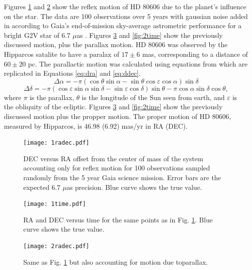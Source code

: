 \documentclass[preprint]{aastex}
\begin{document}
Figures \ref{fig:1radec} and \ref{fig:1time} show the reflex motion of HD 80606 due to the planet's influence on the star. The data are 100 observations over 5 years with gaussian noise added in according to Gaia's end-of-mission sky-average astrometric performance for a bright G2V star of 6.7 $\mu$as \citep{gaia}. 
Figures \ref{fig:2radec} and \ref{fig:2time} show the previously discussed motion, plus the parallax motion. HD 80606 was observed by the Hipparcos satalite to have a paralax of $17\pm6$ mas, corresponding to a distance of $60\pm20$ pc. The parallactic motion was calculated using equations from \citet{parallax} which are replicated in Equations \ref{eq:dra} and \ref{eq:ddec}. 
\begin{equation}
    \Delta\alpha=-\pi(\cos\theta\sin\alpha-\sin\theta\cos\varepsilon\cos\alpha)\sin\delta
    \label{eq:dra}
\end{equation}
\begin{equation}
    \Delta\delta=-\pi(\cos\varepsilon\sin\alpha\sin\delta-\sin\varepsilon\cos\delta)\sin\theta-\pi\cos\alpha\sin\delta\cos\theta,
    \label{eq:ddec}
\end{equation}
where $\pi$ is the parallax, $\theta$ is the longitude of the Sun seen from earth, and $\varepsilon$ is the obliquity of the ecliptic.
Figures \ref{fig:2radec} and \ref{fig:2time} show the previously discussed motion plus the propper motion. The proper motion of HD 80606, measured by Hipparcos, is 46.98 (6.92) mas/yr in RA (DEC).

\begin{figure}
\begin{center}
    \texttt{[image: 1radec.pdf]}
    \caption{DEC versus RA offset from the center of mass of the system accounting only for reflex motion for 100 observations sampled randomly from the 5 year Gaia science mission. Error bars are the expected 6.7 $\mu$as precision. Blue curve shows the true value.}
    \label{fig:1radec}
\end{center}
\end{figure}

\begin{figure}
\begin{center}
    \texttt{[image: 1time.pdf]}
    \caption{RA and DEC versus time for the same points as in Fig. \ref{fig:1radec}. Blue curve shows the true value.}
    \label{fig:1time}
\end{center}
\end{figure}

\begin{figure}
\begin{center}
    \texttt{[image: 2radec.pdf]}
    \caption{Same as Fig. \ref{fig:1radec} but also accounting for motion due toparallax.}
    \label{fig:2radec}
\end{center}
\end{figure}
\end{document}
